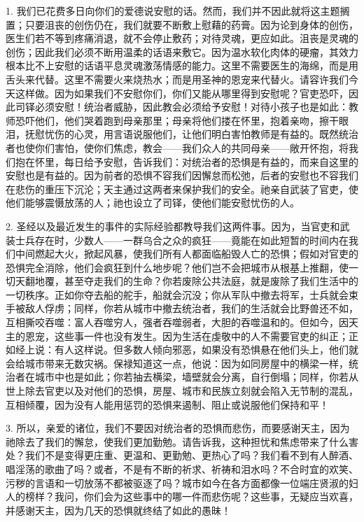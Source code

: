 1. 我们已花费多日向你们的爱德说安慰的话。然而，我们并不因此就将这主题搁置；只要沮丧的创伤仍在，我们就要不断敷上慰藉的药膏。因为论到身体的创伤，医生们若不等到疼痛消退，就不会停止敷药；对待灵魂，更应如此。沮丧是灵魂的创伤；因此我们必须不断用温柔的话语来敷它。因为温水软化肉体的硬瘤，其效力根本比不上安慰的话语平息灵魂激荡情感的能力。这里不需要医生的海绵，而是用舌头来代替。这里不需要火来烧热水；而是用圣神的恩宠来代替火。请容许我们今天这样做。因为如果我们不安慰你们，你们又能从哪里得到安慰呢？官吏恐吓，因此司铎必须安慰！统治者威胁，因此教会必须给予安慰！对待小孩子也是如此：教师恐吓他们，他们哭着跑到母亲那里；母亲将他们搂在怀里，抱着亲吻，擦干眼泪，抚慰忧伤的心灵，用言语说服他们，让他们明白害怕教师是有益的。既然统治者也使你们害怕，使你们焦虑，教会——我们众人的共同母亲——敞开怀抱，将我们抱在怀里，每日给予安慰，告诉我们：对统治者的恐惧是有益的，而来自这里的安慰也是有益的。因为前者的恐惧不容我们因懈怠而松弛，后者的安慰也不容我们在悲伤的重压下沉沦；天主通过这两者来保护我们的安全。祂亲自武装了官吏，使他们能够震慑放荡的人；祂也设立了司铎，使他们能安慰忧伤的人。\par

2. 圣经以及最近发生的事件的实际经验都教导我们这两件事。因为，当官吏和武装士兵存在时，少数人——一群乌合之众的疯狂——竟能在如此短暂的时间内在我们中间燃起大火，掀起风暴，使我们所有人都面临船毁人亡的恐惧；假如对官吏的恐惧完全消除，他们会疯狂到什么地步呢？他们岂不会把城市从根基上推翻，使一切天翻地覆，甚至夺走我们的生命？你若废除公共法庭，就是废除了我们生活中的一切秩序。正如你夺去船的舵手，船就会沉没；你从军队中撤去将军，士兵就会束手被敌人俘虏；同样，你若从城市中撤去统治者，我们的生活就会比野兽还不如，互相撕咬吞噬：富人吞噬穷人，强者吞噬弱者，大胆的吞噬温和的。但如今，因天主的恩宠，这些事一件也没有发生。因为生活在虔敬中的人不需要官吏的纠正；正如经上说：有人这样说。但多数人倾向邪恶，如果没有恐惧悬在他们头上，他们就会给城市带来无数灾祸。保禄知道这一点，他说：因为如同房屋中的横梁一样，统治者在城市中也是如此；你若抽去横梁，墙壁就会分离，自行倒塌；同样，你若从世上除去官吏以及对他们的恐惧，房屋、城市和民族立刻就会陷入无节制的混乱，互相倾覆，因为没有人能用惩罚的恐惧来遏制、阻止或说服他们保持和平！\par

3. 所以，亲爱的诸位，我们不要因对统治者的恐惧而悲伤，而要感谢天主，因为祂除去了我们的懈怠，使我们更加勤勉。请告诉我，这种担忧和焦虑带来了什么害处？我们不是变得更庄重、更温和、更勤勉、更热心了吗？我们看不到有人醉酒、唱淫荡的歌曲了吗？或者，不是有不断的祈求、祈祷和泪水吗？不合时宜的欢笑、污秽的言语和一切放荡不都被驱逐了吗？城市如今在各方面都像一位端庄贤淑的妇人的榜样？我问，你们会为这些事中的哪一件而悲伤呢？这些事，无疑应当欢喜，并感谢天主，因为几天的恐惧就终结了如此的愚昧！\par

